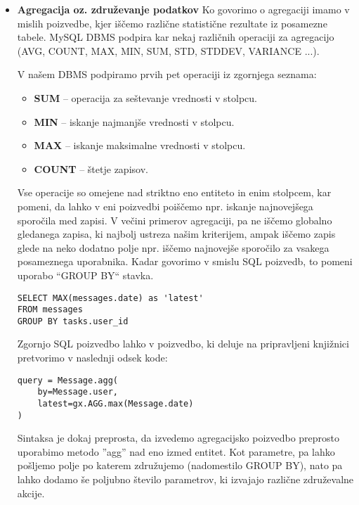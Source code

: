 \documentclass[a4paper,12pt,openright]{book}
\begin{document}
\begin{itemize}
        \item \textbf{Agregacija oz. združevanje podatkov}
        \noindent
        Ko govorimo o agregaciji imamo v mislih poizvedbe, kjer iščemo različne statistične rezultate iz posamezne tabele. MySQL DBMS podpira kar nekaj različnih operaciji za agregacijo \cite{MYSQL_AGG} (AVG, COUNT, MAX, MIN, SUM, STD, STDDEV, VARIANCE ...).

        V našem DBMS podpiramo prvih pet operaciji iz zgornjega seznama:
        \begin{itemize}
            \item \textbf{SUM} – operacija za seštevanje vrednosti v stolpcu.
            \item \textbf{MIN} – iskanje najmanjše vrednosti v stolpcu.
            \item \textbf{MAX} – iskanje maksimalne vrednosti v stolpcu.
            \item \textbf{COUNT} – štetje zapisov.
        \end{itemize}

        Vse operacije so omejene nad striktno eno entiteto in enim stolpcem, kar pomeni, da lahko v eni poizvedbi poiščemo npr. iskanje najnovejšega sporočila med zapisi. V večini primerov agregaciji, pa ne iščemo globalno gledanega zapisa, ki najbolj ustreza našim kriterijem, ampak iščemo zapis glede na neko dodatno polje npr. iščemo najnovejše sporočilo za vsakega posameznega uporabnika. Kadar govorimo v smislu SQL poizvedb, to pomeni uporabo ``GROUP BY`` stavka.

\newpage
\begin{verbatim}
SELECT MAX(messages.date) as 'latest' 
FROM messages
GROUP BY tasks.user_id
\end{verbatim}

        \noindent
        Zgornjo SQL poizvedbo lahko v poizvedbo, ki deluje na pripravljeni knjižnici pretvorimo v naslednji odsek kode:

\begin{verbatim}
query = Message.agg(
    by=Message.user, 
    latest=gx.AGG.max(Message.date)
)
\end{verbatim}

        \noindent
        Sintaksa je dokaj preprosta, da izvedemo agregacijsko poizvedbo preprosto uporabimo metodo ''agg'' nad eno izmed entitet. Kot parametre, pa lahko pošljemo polje po katerem združujemo (nadomestilo GROUP BY), nato pa lahko dodamo še poljubno število parametrov, ki izvajajo različne združevalne akcije.
\end{itemize}
\end{document}
